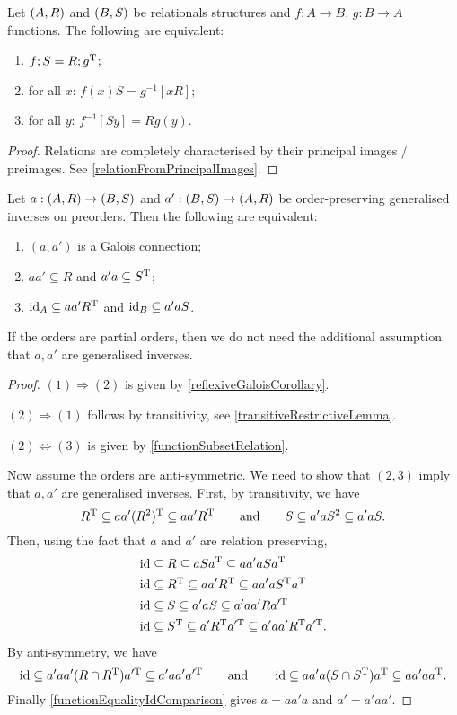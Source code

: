 \begin{lemma} \label{preimagesGaloisIdentity}
Let $\sSet{A, R}$ and $\sSet{B, S}$ be relationals structures and $f: A\to B$, $g: B\to A$ functions.
The following are equivalent:
\begin{enumerate}
\item $f;S = R;g^{\mathrm{T}}$;
\item for all $x$: $f(x)S = g^{-1}[xR]$;
\item for all $y$: $f^{-1}[Sy] = Rg(y)$.
\end{enumerate}
\end{lemma}
\begin{proof}
Relations are completely characterised by their principal images / preimages. See \ref{relationFromPrincipalImages}.
\end{proof}

\begin{proposition} \label{preorderGaloisCondition}
Let $a: \sSet{A,R} \to \sSet{B,S}$ and $a': \sSet{B,S} \to \sSet{A,R}$ be order-preserving generalised inverses on preorders. Then the following are equivalent:
\begin{enumerate}
\item $(a, a')$ is a Galois connection;
\item $aa' \subseteq R$ and $a'a \subseteq S^{\mathrm{T}}$;
\item $\operatorname{id}_A \subseteq aa'R^{\mathrm{T}}$ and $\operatorname{id}_B \subseteq a'aS$.
\end{enumerate}
If the orders are partial orders, then we do not need the additional assumption that $a, a'$ are generalised inverses.
\end{proposition}
\begin{proof}
$(1) \Rightarrow (2)$ is given by \ref{reflexiveGaloisCorollary}.

$(2) \Rightarrow (1)$ follows by transitivity, see \ref{transitiveRestrictiveLemma}.

$(2) \Leftrightarrow (3)$ is given by \ref{functionSubsetRelation}.

Now assume the orders are anti-symmetric. We need to show that $(2,3)$ imply that $a, a'$ are generalised inverses. First, by transitivity, we have
\[ R^{\mathrm{T}} \subseteq aa'(R^2)^{\mathrm{T}} \subseteq aa'R^{\mathrm{T}} \qquad\text{and}\qquad S \subseteq a'aS^2 \subseteq a'aS. \]
Then, using the fact that $a$ and $a'$ are relation preserving,
\begin{align*}
\operatorname{id} &\subseteq R \subseteq aSa^{\mathrm{T}} \subseteq aa'aSa^{\mathrm{T}} \\
\operatorname{id} &\subseteq R^{\mathrm{T}} \subseteq aa'R^{\mathrm{T}} \subseteq aa'aS^{\mathrm{T}} a^{\mathrm{T}} \\
\operatorname{id} &\subseteq S \subseteq a'aS \subseteq a'aa'Ra^{\prime\mathrm{T}} \\
\operatorname{id} &\subseteq S^{\mathrm{T}} \subseteq a'R^{\mathrm{T}} a^{\prime\mathrm{T}} \subseteq a'aa'R^{\mathrm{T}} a^{\prime\mathrm{T}}.
\end{align*}
By anti-symmetry, we have
\[ \operatorname{id} \subseteq a'aa'(R\cap R^{\mathrm{T}})a^{\prime\mathrm{T}} \subseteq a'aa'a^{\prime\mathrm{T}} \qquad\text{and}\qquad \operatorname{id} \subseteq  aa'a(S\cap S^{\mathrm{T}})a^{\mathrm{T}} \subseteq aa'aa^{\mathrm{T}}. \]
Finally \ref{functionEqualityIdComparison} gives $a = aa'a$ and $a' = a'aa'$.
\end{proof}


